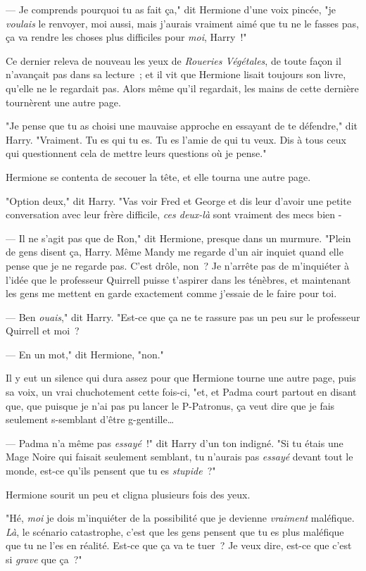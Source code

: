 --- Je comprends pourquoi tu as fait ça," dit Hermione d'une voix pincée, "je \emph{voulais} le renvoyer, moi aussi, mais j'aurais vraiment aimé que tu ne le fasses pas, ça va rendre les choses plus difficiles pour \emph{moi}, Harry~!"

Ce dernier releva de nouveau les yeux de \emph{Roueries Végétales}, de toute façon il n'avançait pas dans sa lecture~; et il vit que Hermione lisait toujours son livre, qu'elle ne le regardait pas. Alors même qu'il regardait, les mains de cette dernière tournèrent une autre page.

"Je pense que tu as choisi une mauvaise approche en essayant de te défendre," dit Harry. "Vraiment. Tu es qui tu es. Tu es l'amie de qui tu veux. Dis à tous ceux qui questionnent cela de mettre leurs questions où je pense."

Hermione se contenta de secouer la tête, et elle tourna une autre page.

"Option deux," dit Harry. "Vas voir Fred et George et dis leur d'avoir une petite conversation avec leur frère difficile, \emph{ces deux-là} sont vraiment des mecs bien -

--- Il ne s'agit pas que de Ron," dit Hermione, presque dans un murmure. "Plein de gens disent ça, Harry. Même Mandy me regarde d'un air inquiet quand elle pense que je ne regarde pas. C'est drôle, non~? Je n'arrête pas de m'inquiéter à l'idée que le professeur Quirrell puisse t'aspirer dans les ténèbres, et maintenant les gens me mettent en garde exactement comme j'essaie de le faire pour toi.

--- Ben \emph{ouais}," dit Harry. "Est-ce que ça ne te rassure pas un peu sur le professeur Quirrell et moi~?

--- En un mot," dit Hermione, "non."

Il y eut un silence qui dura assez pour que Hermione tourne une autre page, puis sa voix, un vrai chuchotement cette fois-ci, "et, et Padma court partout en disant que, que puisque je n'ai pas pu lancer le P-Patronus, ça veut dire que je fais seulement s-semblant d'être g-gentille…

--- Padma n'a même pas \emph{essayé}~!" dit Harry d'un ton indigné. "Si tu étais une Mage Noire qui faisait seulement semblant, tu n'aurais pas \emph{essayé} devant tout le monde, est-ce qu'ils pensent que tu es \emph{stupide}~?"

Hermione sourit un peu et cligna plusieurs fois des yeux.

"Hé, \emph{moi} je dois m'inquiéter de la possibilité que je devienne \emph{vraiment} maléfique. \emph{Là}, le scénario catastrophe, c'est que les gens pensent que tu es plus maléfique que tu ne l'es en réalité. Est-ce que ça va te tuer~? Je veux dire, est-ce que c'est si \emph{grave} que ça~?"


